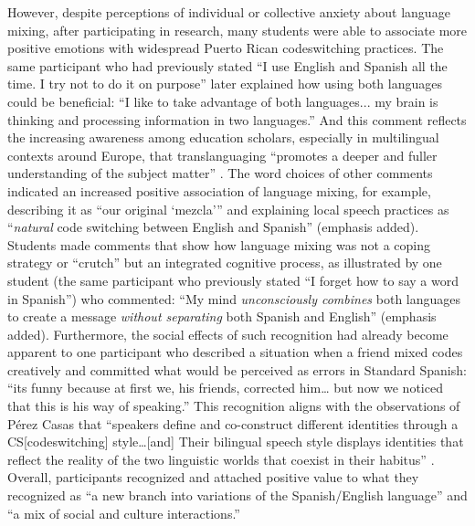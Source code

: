 \documentclass[output=paper,colorlinks,citecolor=brown]{langscibook}
\begin{document}
However, despite perceptions of individual or collective anxiety about language mixing, after participating in research, many students were able to associate more positive emotions with widespread Puerto Rican codeswitching practices. The same participant who had previously stated “I use English and Spanish all the time. I try not to do it on purpose” later explained how using both languages could be beneficial: “I like to take advantage of both languages... my brain is thinking and processing information in two languages.” And this comment reflects the increasing awareness among education scholars, especially in multilingual contexts around Europe, that translanguaging “promotes a deeper and fuller understanding of the subject matter” \citep[281]{Baker_2001}. The word choices of other comments indicated an increased positive association of language mixing, for example, describing it as “our original ‘mezcla’” and explaining local speech practices as “\emph{natural} code switching between English and Spanish” (emphasis added). Students made comments that show how language mixing was not a coping strategy or “crutch” but an integrated cognitive process, as illustrated by one student (the same participant who previously stated “I forget how to say a word in Spanish”) who commented: “My mind \emph{unconsciously combines} both languages to create a message \emph{without separating} both Spanish and English” (emphasis added). Furthermore, the social effects of such recognition had already become apparent to one participant who described a situation when a friend mixed codes creatively and committed what would be perceived as errors in Standard Spanish: “its funny because at first we, his friends, corrected him… but now we noticed that this is his way of speaking.” This recognition aligns with the observations of Pérez Casas that “speakers define and co-construct different identities through a CS[codeswitching] style…[and] Their bilingual speech style displays identities that reflect the reality of the two linguistic worlds that coexist in their habitus” \citep[58]{PerezCasas_2016}. Overall, participants recognized and attached positive value to what they recognized as “a new branch into variations of the Spanish\slash English language” and “a mix of social and culture interactions.”
\end{document}
